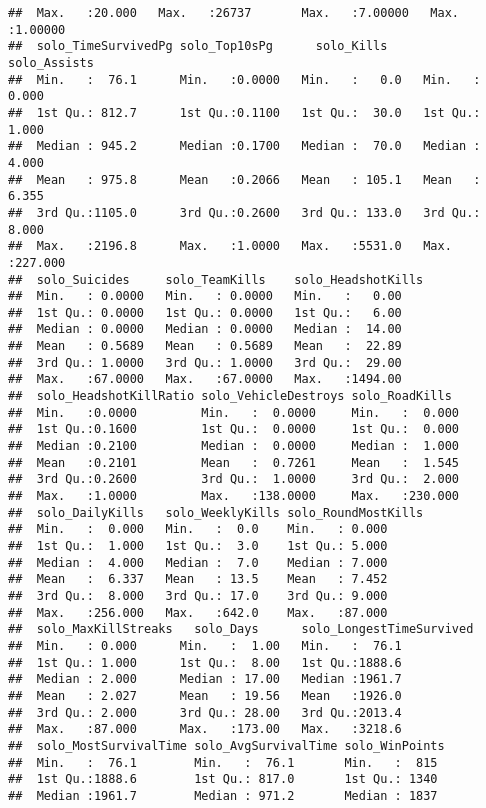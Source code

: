 \documentclass[]{article}
\begin{document}
\begin{verbatim}
##  Max.   :20.000   Max.   :26737       Max.   :7.00000   Max.   :1.00000  
##  solo_TimeSurvivedPg solo_Top10sPg      solo_Kills      solo_Assists    
##  Min.   :  76.1      Min.   :0.0000   Min.   :   0.0   Min.   :  0.000  
##  1st Qu.: 812.7      1st Qu.:0.1100   1st Qu.:  30.0   1st Qu.:  1.000  
##  Median : 945.2      Median :0.1700   Median :  70.0   Median :  4.000  
##  Mean   : 975.8      Mean   :0.2066   Mean   : 105.1   Mean   :  6.355  
##  3rd Qu.:1105.0      3rd Qu.:0.2600   3rd Qu.: 133.0   3rd Qu.:  8.000  
##  Max.   :2196.8      Max.   :1.0000   Max.   :5531.0   Max.   :227.000  
##  solo_Suicides     solo_TeamKills    solo_HeadshotKills
##  Min.   : 0.0000   Min.   : 0.0000   Min.   :   0.00   
##  1st Qu.: 0.0000   1st Qu.: 0.0000   1st Qu.:   6.00   
##  Median : 0.0000   Median : 0.0000   Median :  14.00   
##  Mean   : 0.5689   Mean   : 0.5689   Mean   :  22.89   
##  3rd Qu.: 1.0000   3rd Qu.: 1.0000   3rd Qu.:  29.00   
##  Max.   :67.0000   Max.   :67.0000   Max.   :1494.00   
##  solo_HeadshotKillRatio solo_VehicleDestroys solo_RoadKills   
##  Min.   :0.0000         Min.   :  0.0000     Min.   :  0.000  
##  1st Qu.:0.1600         1st Qu.:  0.0000     1st Qu.:  0.000  
##  Median :0.2100         Median :  0.0000     Median :  1.000  
##  Mean   :0.2101         Mean   :  0.7261     Mean   :  1.545  
##  3rd Qu.:0.2600         3rd Qu.:  1.0000     3rd Qu.:  2.000  
##  Max.   :1.0000         Max.   :138.0000     Max.   :230.000  
##  solo_DailyKills   solo_WeeklyKills solo_RoundMostKills
##  Min.   :  0.000   Min.   :  0.0    Min.   : 0.000     
##  1st Qu.:  1.000   1st Qu.:  3.0    1st Qu.: 5.000     
##  Median :  4.000   Median :  7.0    Median : 7.000     
##  Mean   :  6.337   Mean   : 13.5    Mean   : 7.452     
##  3rd Qu.:  8.000   3rd Qu.: 17.0    3rd Qu.: 9.000     
##  Max.   :256.000   Max.   :642.0    Max.   :87.000     
##  solo_MaxKillStreaks   solo_Days      solo_LongestTimeSurvived
##  Min.   : 0.000      Min.   :  1.00   Min.   :  76.1          
##  1st Qu.: 1.000      1st Qu.:  8.00   1st Qu.:1888.6          
##  Median : 2.000      Median : 17.00   Median :1961.7          
##  Mean   : 2.027      Mean   : 19.56   Mean   :1926.0          
##  3rd Qu.: 2.000      3rd Qu.: 28.00   3rd Qu.:2013.4          
##  Max.   :87.000      Max.   :173.00   Max.   :3218.6          
##  solo_MostSurvivalTime solo_AvgSurvivalTime solo_WinPoints 
##  Min.   :  76.1        Min.   :  76.1       Min.   :  815  
##  1st Qu.:1888.6        1st Qu.: 817.0       1st Qu.: 1340  
##  Median :1961.7        Median : 971.2       Median : 1837  

\end{verbatim}
\end{document}
